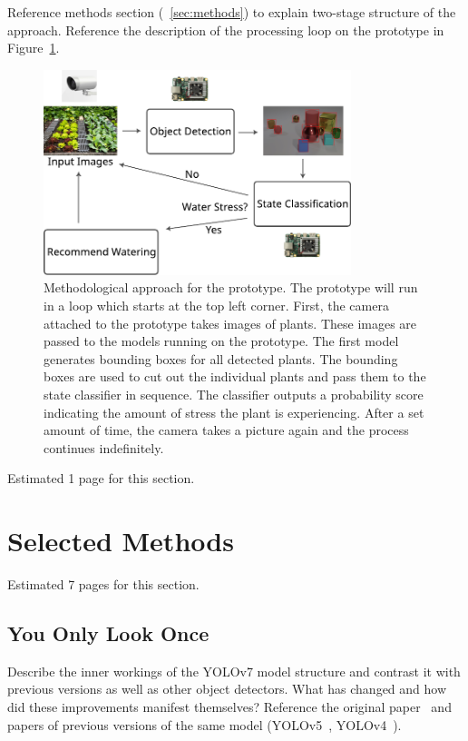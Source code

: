 \documentclass[draft,final]{vutinfth} %
\begin{document}
Reference methods section (~\ref{sec:methods}) to explain two-stage
structure of the approach. Reference the description of the processing
loop on the prototype in Figure~\ref{fig:setup}.

\begin{figure}
  \centering
  \includegraphics[width=0.8\textwidth]{graphics/setup.pdf}
  \caption[Methodological approach for the prototype.]{Methodological
    approach for the prototype. The prototype will run in a loop which
    starts at the top left corner. First, the camera attached to the
    prototype takes images of plants. These images are passed to the
    models running on the prototype. The first model generates
    bounding boxes for all detected plants. The bounding boxes are
    used to cut out the individual plants and pass them to the state
    classifier in sequence. The classifier outputs a probability score
    indicating the amount of stress the plant is experiencing. After a
    set amount of time, the camera takes a picture again and the
    process continues indefinitely.}
  \label{fig:setup}
\end{figure}

Estimated 1 page for this section.

\section{Selected Methods}
\label{sec:selected-methods}

Estimated 7 pages for this section.

\subsection{You Only Look Once}
\label{sec:methods-detection}

Describe the inner workings of the YOLOv7 model structure and contrast
it with previous versions as well as other object detectors. What has
changed and how did these improvements manifest themselves? Reference
the original paper~\cite{wang2022} and papers of previous versions of
the same model (YOLOv5~\cite{jocher2022},
YOLOv4~\cite{bochkovskiy2020}).
\end{document}
